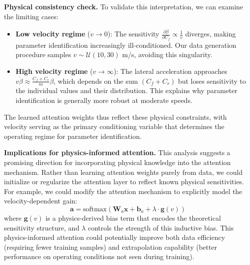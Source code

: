 \documentclass[Afour,sageh,times]{sagej}
\begin{document}
\textbf{Physical consistency check.} To validate this interpretation, we can examine the limiting cases:
\begin{itemize}
    \item \textbf{Low velocity regime} ($v \to 0$): The sensitivity $\frac{\partial \dot{\beta}}{\partial C_f} \propto \frac{1}{v}$ diverges, making parameter identification increasingly ill-conditioned. Our data generation procedure samples $v \sim \mathcal{U}(10, 30)$ m/s, avoiding this singularity.
    \item \textbf{High velocity regime} ($v \to \infty$): The lateral acceleration approaches $v \dot{\beta} \approx \frac{C_f + C_r}{m}\beta$, which depends on the sum $(C_f + C_r)$ but loses sensitivity to the individual values and their distribution. This explains why parameter identification is generally more robust at moderate speeds.
\end{itemize}

The learned attention weights thus reflect these physical constraints, with velocity serving as the primary conditioning variable that determines the operating regime for parameter identification.

\textbf{Implications for physics-informed attention.} This analysis suggests a promising direction for incorporating physical knowledge into the attention mechanism. Rather than learning attention weights purely from data, we could initialize or regularize the attention layer to reflect known physical sensitivities. For example, we could modify the attention mechanism to explicitly model the velocity-dependent gain:
\begin{equation}
\mathbf{a} = \text{softmax}\left(\mathbf{W}_a \mathbf{x} + \mathbf{b}_a + \lambda \cdot \mathbf{g}(v)\right)
\end{equation}
where $\mathbf{g}(v)$ is a physics-derived bias term that encodes the theoretical sensitivity structure, and $\lambda$ controls the strength of this inductive bias. This physics-informed attention could potentially improve both data efficiency (requiring fewer training samples) and extrapolation capability (better performance on operating conditions not seen during training).
\end{document}
